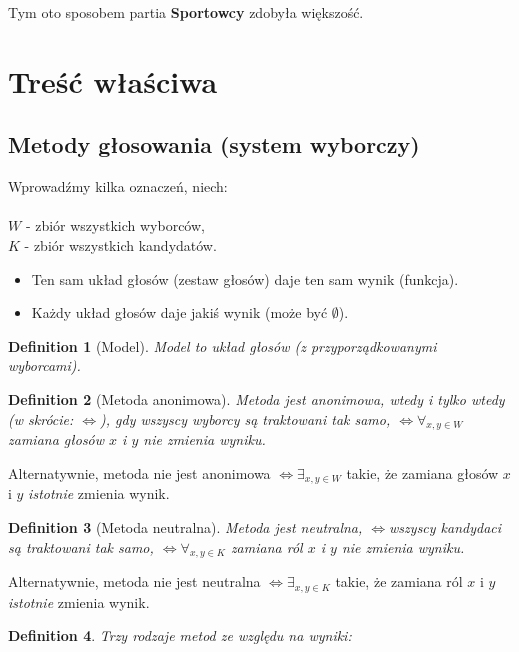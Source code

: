 \documentclass[12pt,a4paper]{article}
\theoremstyle{break}
\newtheorem{definition}{Definition}[section]
\newcommand{\witw}{$\Leftrightarrow$}
\begin{document}
Tym oto sposobem partia \textbf{Sportowcy} zdobyła większość.

	
\newpage

\section{Treść właściwa}
\subsection{Metody głosowania (system wyborczy)}

Wprowadźmy kilka oznaczeń, niech: \\
\\ $W$ - zbiór wszystkich wyborców, \\
$K$ - zbiór wszystkich kandydatów.
\begin{itemize}
	\item Ten sam układ głosów (zestaw głosów) daje ten sam wynik (funkcja).
	\item Każdy układ głosów daje jakiś wynik (może być $\emptyset$).
\end{itemize}

\begin{definition}[Model]
	Model to układ głosów (z przyporządkowanymi wyborcami).
\end{definition}

\begin{definition}[Metoda anonimowa]
	Metoda jest anonimowa, \textit{wtedy i tylko wtedy} (w skrócie: \witw), gdy wszyscy wyborcy są traktowani tak samo, \witw $\forall_{x,y \in W}$ zamiana głosów $x$ i $y$ nie zmienia wyniku.
\end{definition}

Alternatywnie, metoda nie jest anonimowa \witw $\exists_{x,y \in W}$ takie, że zamiana głosów $x$ i $y$ \textit{istotnie} zmienia wynik.

\begin{definition}[Metoda neutralna]
	Metoda jest neutralna, \witw wszyscy kandydaci są traktowani tak samo, \witw $\forall_{x,y \in K}$ zamiana ról $x$ i $y$ nie zmienia wyniku.
\end{definition}

Alternatywnie, metoda nie jest neutralna \witw $\exists_{x,y \in K}$ takie, że zamiana ról $x$ i $y$ \textit{istotnie} zmienia wynik.

\begin{definition}
	Trzy rodzaje metod ze względu na wyniki:
\end{definition}
\end{document}
